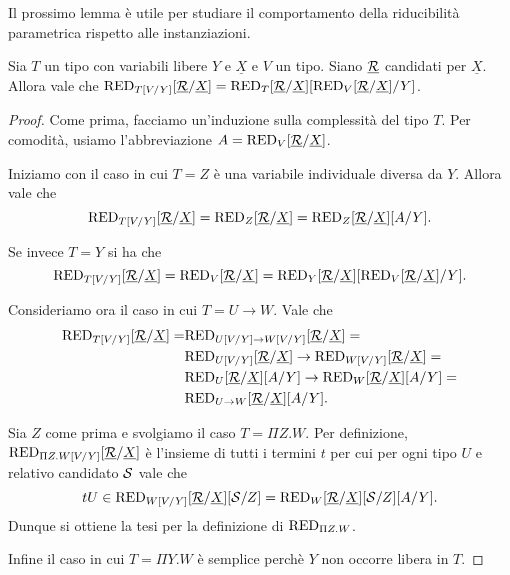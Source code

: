 \documentclass[]{marticle}
\begin{document}
Il prossimo lemma \`e utile per studiare il comportamento della riducibilit\`a
parametrica rispetto alle instanziazioni. 
\begin{block} [Lemma]
    \label{lm_sub}
    Sia $T$ un tipo con variabili libere $Y$ e $\underline{X}$ e $V$ un tipo.
    Siano $\underline{\mathcal{R}}$ candidati per $\underline{X}$. Allora vale che
    $\text{RED}_{T[V/Y]}[\underline{\mathcal{R}}/\underline{X}]= \text{RED}_{T}[\underline{\mathcal{R}}/\underline{X}] [\text{RED}_{V}[\underline{\mathcal{R}}/\underline{X}]/Y]$.
\end{block}
\begin{proof}
    Come prima, facciamo un'induzione sulla complessit\`a del tipo $T$. Per
    comodit\`a, usiamo l'abbreviazione $A=\text{RED}_{V}[\underline{\mathcal{R}}/\underline{X}]$.

    Iniziamo con il caso in cui $T=Z$ \`e una variabile individuale diversa da
    $Y$. Allora vale che 
    \[
        \text{RED}_{T[V/Y]}[\underline{\mathcal{R}}/\underline{X}] = \text{RED}_{Z}[\underline{\mathcal{R}}/\underline{X}] = \text{RED}_{Z}[\underline{\mathcal{R}}/\underline{X}][A/Y].
    \]

    Se invece $T=Y$ si ha che
    \[
        \text{RED}_{T[V/Y]}[\underline{\mathcal{R}}/\underline{X}] = \text{RED}_{V}[\underline{\mathcal{R}}/\underline{X}] = \text{RED}_{Y}[\underline{\mathcal{R}}/\underline{X}][
            \text{RED}_{V}[\underline{\mathcal{R}}/\underline{X}]/Y].
    \]

    Consideriamo ora il caso in cui $T=U\rightarrow W$. Vale che
    \begin{align*}
        \text{RED}_{T[V/Y]}[\underline{\mathcal{R}}/\underline{X}] = 
        &\text{RED}_{U[V/Y]\rightarrow W[V/Y]}[\underline{\mathcal{R}}/\underline{X}] =  \\
        &\text{RED}_{U[V/Y]}[\underline{\mathcal{R}}/\underline{X}] \rightarrow \text{RED}_{W[V/Y]}[\underline{\mathcal{R}}/\underline{X}]= \\
        &\text{RED}_{U}[\underline{\mathcal{R}}/\underline{X}][A/Y] \rightarrow\text{RED}_{W}[\underline{\mathcal{R}}/\underline{X}][A/Y] = \\
        &\text{RED}_{U\rightarrow W}[\underline{\mathcal{R}}/\underline{X}][A/Y].
    \end{align*}

    Sia $Z$ come prima e svolgiamo il caso $T=\Pi Z. W$. Per definizione,
    $\text{RED}_{\Pi Z. W[V/Y]}[\underline{\mathcal{R}}/\underline{X}]$ \`e l'insieme di tutti i termini $t$ per
    cui per ogni tipo $U$ e relativo candidato $\mathcal{S}$ vale che
    \[
        tU\in \text{RED}_{W[V/Y]}[\underline{\mathcal{R}}/\underline{X}][\mathcal{S}/Z] = 
        \text{RED}_{W}[\underline{\mathcal{R}}/\underline{X}][\mathcal{S}/Z][A/Y].
    \]
    Dunque si ottiene la tesi per la definizione di $\text{RED}_{\Pi Z.W}$.

    Infine il caso in cui $T=\Pi Y.W$ \`e semplice perch\`e $Y$ non occorre
    libera in $T$.
\end{proof}
\end{document}
